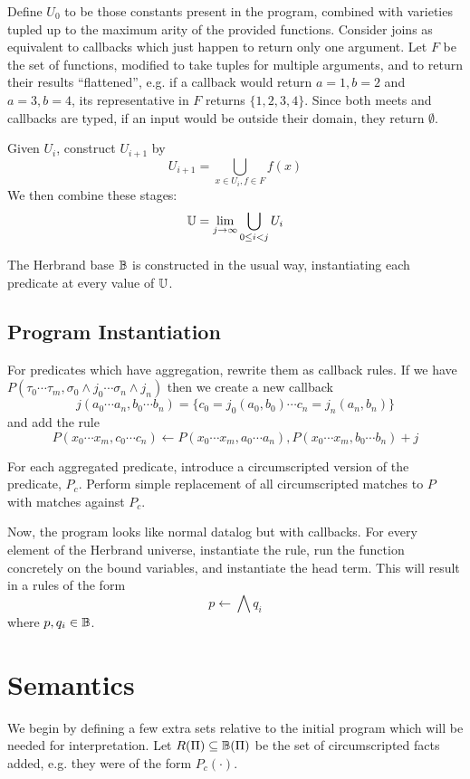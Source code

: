 Define $U_0$ to be those constants present in the program, combined with varieties tupled up to the maximum arity of the provided functions.
Consider joins as equivalent to callbacks which just happen to return only one argument.
Let $F$ be the set of functions, modified to take tuples for multiple arguments, and to return their results ``flattened'', e.g. if a callback would return $a = 1, b = 2$ and $a = 3, b = 4$, its representative in $F$ returns $\{1, 2, 3, 4\}$.
Since both meets and callbacks are typed, if an input would be outside their domain, they return $\emptyset$.

Given $U_i$, construct $U_{i + 1}$ by
\[
	U_{i + 1} = \bigcup_{x \in U_i, f \in F} f(x)
\]
We then combine these stages:
\[
	\mathbb{U} = \lim_{j \rightarrow \infty} \bigcup_{0 \leq i < j} U_i
\]

The Herbrand base $\mathbb{B}$ is constructed in the usual way, instantiating each predicate at every value of $\mathbb{U}$.

\subsection{Program Instantiation}
For predicates which have aggregation, rewrite them as callback rules.
If we have $P(\tau_0 \cdots \tau_m, \sigma_0\wedge j_0 \cdots \sigma_n \wedge j_n)$ then we create a new callback
\[
	j(a_0 \cdots a_n, b_0 \cdots b_n) = \{c_0 = j_0(a_0, b_0) \cdots c_n = j_n(a_n, b_n)\}
\]
and add the rule
\[
	P(x_0 \cdots x_m, c_0 \cdots c_n) \leftarrow P(x_0 \cdots x_m, a_0 \cdots a_n), P(x_0 \cdots x_m, b_0 \cdots b_n) + j
\]

For each aggregated predicate, introduce a circumscripted version of the predicate, $P_c$.
Perform simple replacement of all circumscripted matches to $P$ with matches against $P_c$.

Now, the program looks like normal datalog but with callbacks.
For every element of the Herbrand universe, instantiate the rule, run the function concretely on the bound variables, and instantiate the head term.
This will result in a rules of the form
\[
	p \leftarrow \bigwedge q_i
\]
where $p, q_i \in \mathbb{B}$.

\section{Semantics}
\label{formal:sec:semantics}
We begin by defining a few extra sets relative to the initial program which will be needed for interpretation.
Let $R(\Pi) \subseteq \mathbb{B}(\Pi)$ be the set of circumscripted facts added, e.g. they were of the form $P_c(\cdot)$.

